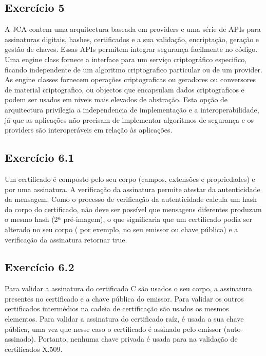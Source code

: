 \documentclass[11pt]{report}
\begin{document}
\subsection{Exercício 5}
A JCA contem uma arquitectura baseada em providers e uma série de APIs para assinaturas digitais, hashes, certificados e a sua validação, encriptação, geração e gestão de chaves. Essas APIs permitem integrar segurança facilmente no código.
Uma engine class fornece a interface para um serviço criptográfico especifico, ficando independente de um algoritmo criptografico particular ou de um provider. As engine classes fornecem operações criptograficas ou geradores ou conversores de material criptografico, ou objectos que encapsulam dados criptograficos e podem ser usados em niveis mais elevados de abstração.
Esta opção de arquitectura privilegia a independencia de implementação e a interoperabilidade, já que as aplicações não precisam de implementar algoritmos de segurança e os providers são interoperáveis em relação às aplicações.\\

\subsection{Exercício 6.1}
Um certificado é composto pelo seu corpo (campos, extensões e propriedades) e por uma assinatura. A verificação da assinatura permite atestar da autenticidade da mensagem.
Como o processo de verificação da autenticidade calcula um hash do corpo do certificado, não deve ser possível que mensagens diferentes produzam o mesmo hash (2ª pré-imagem), o que significaria que um certificado podia ser alterado no seu corpo ( por exemplo, no seu emissor ou chave pública) e a verificação da assinatura retornar true.\\

\subsection{Exercício 6.2}
Para validar a assinatura do certificado C são usados o seu corpo, a assinatura presentes no certificado e a chave pública do emissor. Para validar os outros certificados intermédios na cadeia de certificação são usados os mesmos elementos. Para validar a assinatura do certificado raíz, é usada a sua chave pública, uma vez que nesse caso o certificado é assinado pelo emissor (auto-assinado). Portanto, nenhuma chave privada é usada para na validação de certificados X.509.\\
\end{document}
